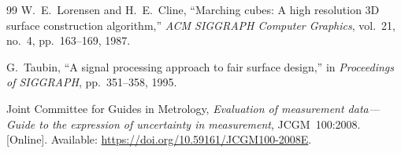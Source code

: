\documentclass[11pt,a4paper]{article}
\numberwithin{equation}{section}
\begin{document}
\begin{thebibliography}{99}
W.~E.~Lorensen and H.~E.~Cline, ``Marching cubes: A high resolution 3D surface construction algorithm,'' \emph{ACM SIGGRAPH Computer Graphics}, vol.~21, no.~4, pp.~163--169, 1987.

G.~Taubin, ``A signal processing approach to fair surface design,'' in \emph{Proceedings of SIGGRAPH}, pp.~351--358, 1995.

Joint Committee for Guides in Metrology, \emph{Evaluation of measurement data---Guide to the expression of uncertainty in measurement}, JCGM~100:2008. [Online]. Available: \url{https://doi.org/10.59161/JCGM100-2008E}.
\end{thebibliography}
\end{document}
